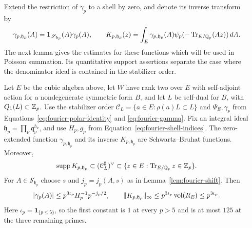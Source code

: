 Extend the restriction of $\gamma_p$ to a shell by zero, and denote its
inverse transform by
\begin{equation}\label{eq:fourier-shell-transform}
 \gamma_{p,\mathfrak h_p}(A)
   =\mathbf1_{\mathscr S_{\mathfrak h_p}}(A)\gamma_p(A),
 \qquad
 K_{p,\mathfrak h_p}(z)
   =\int_E\gamma_{p,\mathfrak h_p}(A)
             \psi_p(-\operatorname{Tr}_{E/\mathbb Q_p}(Az))\,dA.
\end{equation}
The next lemma gives the estimates for these functions which will be used
in Poisson summation.  Its quantitative support assertions separate the case where
the denominator ideal is contained in the stabilizer order.

\begin{lemma}\label{lem:fourier-shell-estimates}
Let $E$ be the cubic algebra above, let $W$ have rank two over $E$ with
self-adjoint action for a nondegenerate symmetric form $B$, and let $L$ be
self-dual for $B$, with $Q_1(L)\subset\mathbb Z_p$.  Use the stabilizer order
$\mathcal C_L=\{a\in E:\rho(a)L\subset L\}$ and $\Psi_E,\gamma_p$ from
Equations~\eqref{eq:fourier-polar-identity} and \eqref{eq:fourier-gamma}.
Fix an integral ideal
$\mathfrak h_p=\prod_\nu\mathfrak q_\nu^{h_\nu}$, and use
$H_p,g_p$ from Equation~\eqref{eq:fourier-shell-indices}.
The zero-extended function $\gamma_{p,\mathfrak h_p}$ and its inverse
$K_{p,\mathfrak h_p}$ are Schwartz--Bruhat functions.  Moreover,
\[
 \operatorname{supp} K_{p,\mathfrak h_p}\subset(\mathcal C_L^\sharp)^\vee
 \subset\{z\in E:\operatorname{Tr}_{E/\mathbb Q_p}z\in\mathbb Z_p\}.
\]
For
$A\in\mathscr S_{\mathfrak h_p}$ choose $s$ and $j_p=j_p(A,s)$ as in
Lemma~\ref{lem:fourier-shift}.  Then
\begin{equation}\label{eq:fourier-shell-decay}
 |\gamma_p(A)|\le p^{3\iota_p}H_p^{-1}p^{-j_p/2},
 \qquad
 \|K_{p,\mathfrak h_p}\|_\infty
       \le p^{3\iota_p}\operatorname{vol}(R_E)\le p^{3\iota_p}.
\end{equation}
Here $\iota_p=\mathbf1_{\{p\le5\}}$, so the first constant is $1$ at
every $p>5$ and is at most $125$ at the three remaining primes.


\end{lemma}
